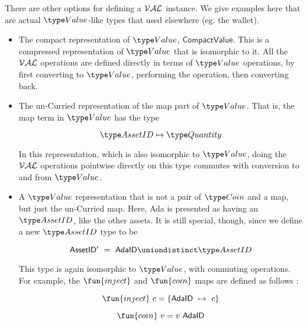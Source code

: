 There are other options for defining a $\mathcal{VAL}$ instance. We give examples here
that are actual $\Value$-like types that used elsewhere (eg. the wallet).

\begin{itemize}
  \item The compact representation of $\Value$, $\mathsf{CompactValue}$. This
  is a compressed representation of $\Value$ that is isomorphic to it.
  All the $\mathcal{VAL}$ operations
  are defined directly in terms of $\Value$ operations, by first converting
  to $\Value$, performing the operation, then converting back.

  \item The un-Curried representation of the map part of $\Value$. That is,
  the map term in $\Value$ has the type

  \[ \AssetID \mapsto \Quantity \]

  In this representation, which is also isomorphic to $\Value$, doing the
  $\mathcal{VAL}$ operations pointwise directly on this type commutes with conversion to
  and from $\Value$.

  \item A $\Value$ representation that is not a pair of $\Coin$ and a map, but just
  the un-Curried map. Here, Ada is presented as having an $\AssetID$,
  like the other assets. It is still special, though, since we define a new
  $\AssetID$ type to be

  \[ \mathsf{AssetID'} ~=~ \mathsf{AdaID} \uniondistinct \AssetID \]

  This type is again isomorphic to $\Value$, with commuting operations. For
  example, the $\fun{inject}$ and $\fun{coin}$ maps are defined as follows :

  \[ \fun{inject}~c = \{ \mathsf{AdaID}~\mapsto~c \} \]

  \[ \fun{coin}~v = v~\mathsf{AdaID} \]
\end{itemize}
